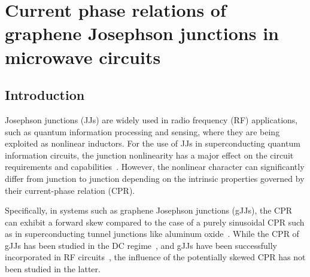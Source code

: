 \newchapstyle
\chapter{Current phase relations of graphene Josephson junctions in microwave circuits}
\label{chap:gJJ-CPR}


\begin{abstract}
	We perform extensive analysis of graphene Josephson junctions embedded in microwave circuits.
	By comparing a diffusive junction at \SI{15}{\milli\kelvin} with a ballistic one at \SI{15}{\milli\kelvin} and \SI{1}{\kelvin}, we are able to reconstruct the current-phase relation.
\end{abstract}

\newpage

\section{Introduction}

Josephson junctions (JJs) are widely used in radio frequency (RF) applications, such as quantum information processing and sensing, where they are being exploited as nonlinear inductors.
%
For the use of JJs in superconducting quantum information circuits, the junction nonlinearity has a major effect on the circuit requirements and capabilities~\cite{kringhojAnharmonicitySuperconductingQubit2018}.
%
However, the nonlinear character can significantly differ from junction to junction depending on the intrinsic properties governed by their current-phase relation (CPR).

Specifically, in systems such as graphene Josephson junctions (gJJs), the CPR can exhibit a forward skew compared to the case of a purely sinusoidal CPR such as in superconducting tunnel junctions like aluminum oxide~\cite{ginzburgDeterminationCurrentPhase2018}.
%
While the CPR of gJJs has been studied in the DC regime~\cite{englishObservationNonsinusoidalCurrentphase2016,nandaCurrentPhaseRelationBallistic2017}, and gJJs have been successfully incorporated in RF circuits~\cite{schmidtBallisticGrapheneSuperconducting2018,krollMagneticFieldCompatible2018,wangCoherentControlHybrid2019}, the influence of the potentially skewed CPR has not been studied in the latter.

